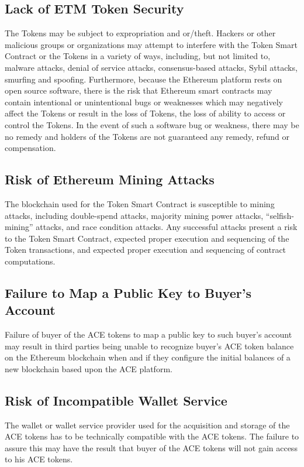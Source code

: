 \documentclass[12pt]{report}
\begin{document}
\subsection*{Lack of ETM Token Security}
The Tokens may be subject to expropriation and or/theft. Hackers or other malicious groups or organizations may attempt to interfere with the Token Smart Contract or the Tokens in a variety of ways, including, but not limited to, malware attacks, denial of service attacks, consensus-based attacks, Sybil attacks, smurfing and spoofing.
Furthermore, because the Ethereum platform rests on open source software, there is the risk that Ethereum smart contracts may contain intentional or unintentional bugs or weaknesses which may negatively affect the Tokens or result in the loss of Tokens, the loss of ability to access or control the Tokens. In the event of such a software bug or weakness, there may be no remedy and holders of the Tokens are not guaranteed any remedy, refund or compensation.

\subsection*{Risk of Ethereum Mining Attacks}
The blockchain used for the Token Smart Contract is susceptible to mining attacks, including double-spend attacks, majority mining power attacks, “selfish-mining” attacks, and race condition attacks. Any successful attacks present a risk to the Token Smart Contract, expected proper execution and sequencing of the Token transactions, and expected proper execution and sequencing of contract computations.

\subsection*{Failure to Map a Public Key to Buyer’s Account}
Failure of buyer of the ACE tokens to map a public key to such buyer’s account may result in third parties being unable to recognize buyer’s ACE token balance on the Ethereum blockchain when and if they configure the initial balances of a new blockchain based upon the ACE platform.

\subsection*{Risk of Incompatible Wallet Service}
The wallet or wallet service provider used for the acquisition and storage of the ACE tokens has to be technically compatible with the ACE tokens. The failure to assure this may have the result that buyer of the ACE tokens will not gain access to his ACE tokens.
\end{document}
